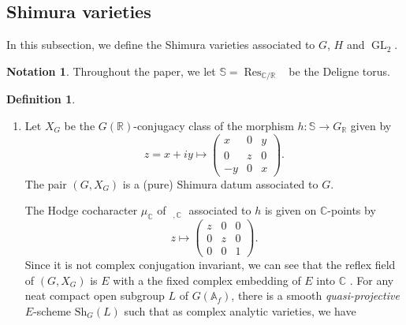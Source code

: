 \documentclass[11pt, a4paper]{amsart}
\theoremstyle{plain}
\theoremstyle{definition}
\newtheorem{definition}[theorem]{Definition}
\newtheorem{notation}[theorem]{Notation}
\numberwithin{equation}{section}
\def\AAA{\mathbb{A}}
\def\CC{\mathbb{C}}
\def\RR{\mathbb{R}}
\DeclareMathOperator{\Res}{Res}
\DeclareMathOperator{\GL}{\mathrm{GL}}
\DeclareMathOperator{\Gm}{\mathrm{G_{m}}}
\newcommand{\Sh}{\mathrm{Sh}}
\begin{document}
\subsection{Shimura varieties}
\label{SS:Shimura varieties}
In this subsection, we define the Shimura varieties associated to $G$, $H$ and $\GL_{2}$. 

    
\begin{notation}
    Throughout the paper, we let $\mathbb{S} = \Res_{\CC/\RR} \Gm$ be the Deligne torus. 
\end{notation}

\begin{definition}
\label{def: Shimura variety}
    \begin{enumerate}
        \item Let $X_{G}$ be the $G(\RR)$-conjugacy class of the morphism $h \colon \mathbb{S} \rightarrow G_{\RR}$ given by 
              \begin{equation*}
                  z = x + iy \mapsto \begin{pmatrix}
                                        x & 0 & y \\
                                        0 & z & 0 \\
                                        -y & 0 & x
                                     \end{pmatrix}.
              \end{equation*}
              The pair $(G, X_{G})$ is a (pure) Shimura datum associated to $G$. 
              \par The Hodge cocharacter $\mu_{\CC}$ of $\Gm_{, \CC}$ associated to $h$ is given on $\CC$-points by 
              \begin{equation*}
                  z \mapsto \begin{pmatrix}
                                z & 0 & 0 \\
                                0 & z & 0 \\
                                0 & 0 & 1 
                            \end{pmatrix}.
              \end{equation*}
              Since it is not complex conjugation invariant, we can see that the reflex field of $(G, X_{G})$ is $E$ with a the fixed complex embedding of $E$ into $\CC$ \cite[Lemma 4.2., P15]{LR92}. 
              For any neat compact open subgroup $L$ of $G(\AAA_f)$, there is a smooth \textit{quasi-projective} $E$-scheme $\Sh_{G}(L)$ such that as complex analytic varieties, we have 

\end{enumerate}
\end{definition}
\end{document}
